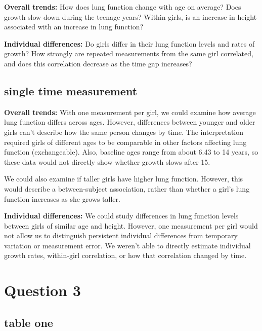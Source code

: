 \documentclass[
]{article}
\begin{document}
\textbf{Overall trends:} How does lung function change with age on
average? Does growth slow down during the teenage years? Within girls,
is an increase in height associated with an increase in lung function?

\textbf{Individual differences:} Do girls differ in their lung function
levels and rates of growth? How strongly are repeated measurements from
the same girl correlated, and does this correlation decrease as the time
gap increases?

\subsection{single time measurement}\label{single-time-measurement}

\textbf{Overall trends:} With one measurement per girl, we could examine
how average lung function differs across ages. However, differences
between younger and older girls can't describe how the same person
changes by time. The interpretation required girls of different ages to
be comparable in other factors affecting lung function (exchangeable).
Also, baseline ages range from about 6.43 to 14 years, so these data
would not directly show whether growth slows after 15.

We could also examine if taller girls have higher lung function.
However, this would describe a between-subject association, rather than
whether a girl's lung function increases as she grows taller.

\textbf{Individual differences:} We could study differences in lung
function levels between girls of similar age and height. However, one
measurement per girl would not allow us to distinguish persistent
individual differences from temporary variation or measurement error. We
weren't able to directly estimate individual growth rates, within-girl
correlation, or how that correlation changed by time.

\section{Question 3}\label{question-3}

\subsection{table one}\label{table-one}
\end{document}
